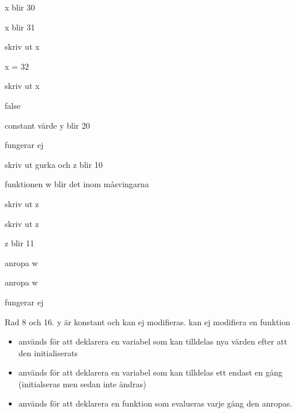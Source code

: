 






\Task %

\Subtask 

x blir 30

x blir 31

skriv ut x

x = 32

skriv ut x

false

constant värde y blir 20

fungerar ej

skriv ut gurka och z blir 10

funktionen w blir det inom måsvingarna

skriv ut z

skriv ut z

z blir 11

anropa w

anropa w

fungerar ej

\Subtask  Rad 8 och 16. y är konstant och kan ej modifieras. kan ej modifiera en funktion

\Subtask 
\begin{itemize}[noitemsep, nolistsep]
\item {} används för att deklarera en variabel som kan tilldelas nya värden efter att den initialiserats
\item {} används för att deklarera en variabel som kan tilldelas ett endast en gång (initialseras men sedan inte ändras)
\item {} används för att deklarera en funktion som evalueras varje gång den anropas.
\end{itemize}

